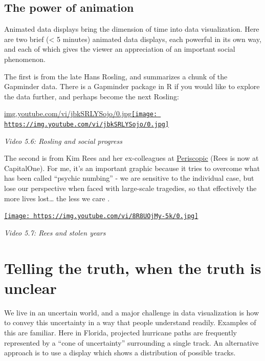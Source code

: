 \documentclass[
  openany]{book}
\begin{document}
\hypertarget{the-power-of-animation}{%
\subsection{The power of animation}\label{the-power-of-animation}}

Animated data displays bring the dimension of time into data visualization. Here are two brief (\textless{} 5 minutes) animated data displays, each powerful in its own way, and each of which gives the viewer an appreciation of an important social phenomenon.

The first is from the late Hans Rosling, and summarizes a chunk of the Gapminder data. There is a Gapminder package in R if you would like to explore the data further, and perhaps become the next Rosling:

\href{https://youtu.be/jbkSRLYSojo}{img.youtube.com/vi/jbkSRLYSojo/0.jpg\texttt{[image: https://img.youtube.com/vi/jbkSRLYSojo/0.jpg]}}

\emph{Video 5.6: Rosling and social progress}

The second is from Kim Rees and her ex-colleagues at \href{https://periscopic.com/}{Periscopic} (Rees is now at CapitalOne). For me, it's an important graphic because it tries to overcome what has been called ``psychic numbing'' - we are sensitive to the individual case, but lose our perspective when faced with large-scale tragedies, so that effectively the more lives lost\ldots{} the less we care \citep{slovic2013psychic}.

\href{https://youtu.be/8R8UOjMy-5k}{\texttt{[image: https://img.youtube.com/vi/8R8UOjMy-5k/0.jpg]}}

\emph{Video 5.7: Rees and stolen years}

\hypertarget{telling-the-truth-when-the-truth-is-unclear}{%
\section{Telling the truth, when the truth is unclear}\label{telling-the-truth-when-the-truth-is-unclear}}

We live in an uncertain world, and a major challenge in data visualization is how to convey this uncertainty in a way that people understand readily. Examples of this are familiar. Here in Florida, projected hurricane paths are frequently represented by a ``cone of uncertainty'' surrounding a single track. An alternative approach is to use a display which shows a distribution of possible tracks.
\end{document}
